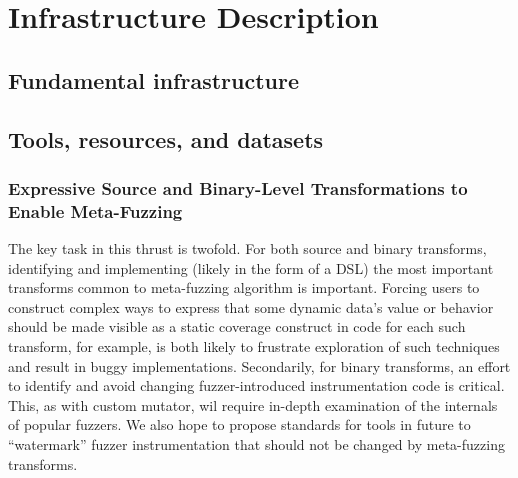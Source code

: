 \section{Infrastructure Description}

\subsection{Fundamental infrastructure}



\subsection{Tools, resources, and datasets}


\subsubsection{Expressive Source and Binary-Level Transformations to 
Enable Meta-Fuzzing}

The key task in this thrust is twofold.  For both source and binary transforms, 
identifying and implementing (likely in the form of a DSL) the most important 
transforms common to meta-fuzzing algorithm is important.  Forcing users to 
construct complex ways to express that some dynamic data's value or behavior 
should be made visible as a static coverage construct in code for each such 
transform, for example, is both likely to frustrate exploration of such 
techniques and result in buggy implementations.  Secondarily, for binary 
transforms, an effort to identify and avoid changing fuzzer-introduced 
instrumentation code is critical.  This, as with custom mutator, wil require 
in-depth examination of the internals of popular fuzzers.  We also hope to 
propose standards for tools in future to ``watermark'' fuzzer instrumentation 
that should not be changed by meta-fuzzing transforms.

